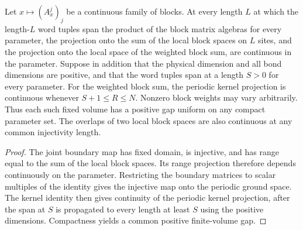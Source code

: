 \begin{lemma}
    \label{thm:block_ground_space_continuity}
    \leanok
    Let $x\mapsto(A_x^j)_j$ be a continuous family of blocks. At every
    length $L$ at which the length-$L$ word tuples span the product of the
    block matrix algebras for every parameter, the projection onto the sum
    of the local block spaces on $L$ sites, and the projection onto the
    local space of the weighted block sum, are continuous in the parameter.
    Suppose in addition that the physical dimension and all bond dimensions
    are positive, and that the word tuples span at a length $S>0$ for every
    parameter. For the weighted block sum, the periodic kernel projection
    is continuous whenever $S+1\leq R\leq N$. Nonzero block weights may
    vary arbitrarily. Thus each such fixed volume has a positive gap
    uniform on any compact parameter set. The overlaps of two local block spaces are also
    continuous at any common injectivity length.
\end{lemma}

\begin{proof}
    \leanok
    The joint boundary map has fixed domain, is injective, and has range
    equal to the sum of the local block spaces. Its range projection
    therefore depends continuously on the parameter. Restricting the
    boundary matrices to scalar multiples of the identity gives the
    injective map onto the periodic ground space. The kernel identity
    then gives continuity of the periodic kernel projection, after the
    span at $S$ is propagated to every length at least $S$ using the
    positive dimensions. Compactness
    yields a common positive finite-volume gap.
\end{proof}


